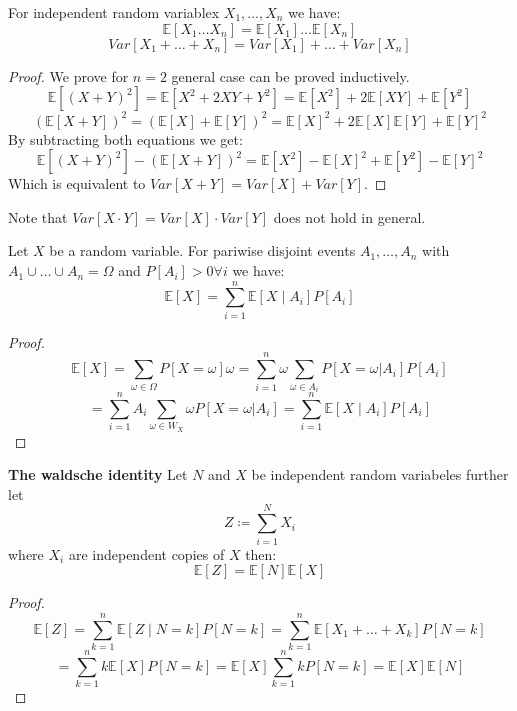 \begin{theorem}
	For independent random variablex $X_1, \dots , X_n$ we have:
	$$\mathbb{E}[X_1 \dots X_n] = \mathbb{E}[X_1] \dots \mathbb{E}[X_n]$$
	$$Var[X_1 + \dots + X_n] = Var[X_1] + \dots + Var[X_n]$$
\end{theorem}

\begin{proof}
	We prove for $n = 2$ general case can be proved inductively.
	$$\mathbb{E}[(X+Y)^2] = \mathbb{E}[X^2 + 2XY + Y^2] = \mathbb{E}[X^2] + 2\mathbb{E}[XY] + \mathbb{E}[Y^2]$$
	$$(\mathbb{E}[X+Y])^2 = (\mathbb{E}[X] + \mathbb{E}[Y])^2 = \mathbb{E}[X]^2 + 2\mathbb{E}[X]\mathbb{E}[Y] + \mathbb{E}[Y]^2$$
	By subtracting both equations we get:
	$$\mathbb{E}[(X+Y)^2] - (\mathbb{E}[X+Y])^2 = \mathbb{E}[X^2] - \mathbb{E}[X]^2 + \mathbb{E}[Y^2] - \mathbb{E}[Y]^2$$
	Which is equivalent to $Var[X+Y] = Var[X] + Var[Y]$.
\end{proof}

\begin{important}
	Note that $Var[X \cdot Y] = Var[X] \cdot Var[Y]$ does not hold in general.
\end{important}

\begin{theorem}
	Let $X$ be a random variable. For pariwise disjoint events $A_1, \dots, A_n$ with $A_1 \cup \dots \cup A_n = \Omega$  and $P[A_i] > 0 \forall i$ we have:
	$$\mathbb{E}[X] = \sum_{i=1}^n \mathbb{E}[X \mid A_i] P[A_i]$$
\end{theorem}

\begin{proof}
	$$\mathbb{E}[X] = \sum_{\omega \in \Omega} P[X=\omega] \omega = \sum_{i=1}^n \omega \sum_{\omega \in A_i} P[X=\omega | A_i] P[A_i]$$
	$$ = \sum_{i=1}^n A_i \sum_{\omega \in W_X } \omega P[X=\omega | A_i] = \sum_{i=1}^n \mathbb{E}[X \mid A_i] P[A_i]$$
\end{proof}

\begin{theorem}
	\textbf{The waldsche identity}
	Let $N$ and $X$ be independent random variabeles further let
	$$Z \coloneqq \sum_{i=1}^N X_i$$
	where $X_i$ are independent copies of $X$ then:
	$$\mathbb{E}[Z] = \mathbb{E}[N] \mathbb{E}[X]$$
\end{theorem}

\begin{proof}
	$$\mathbb{E}[Z] = \sum_{k=1}^n \mathbb{E}[Z \mid N=k] P[N=k] = \sum_{k=1}^n \mathbb{E}[X_1 + \dots + X_k] P[N=k]$$
	$$= \sum_{k=1}^n k \mathbb{E}[X] P[N=k] = \mathbb{E}[X] \sum_{k=1}^n k P[N=k] = \mathbb{E}[X] \mathbb{E}[N]$$
\end{proof}

